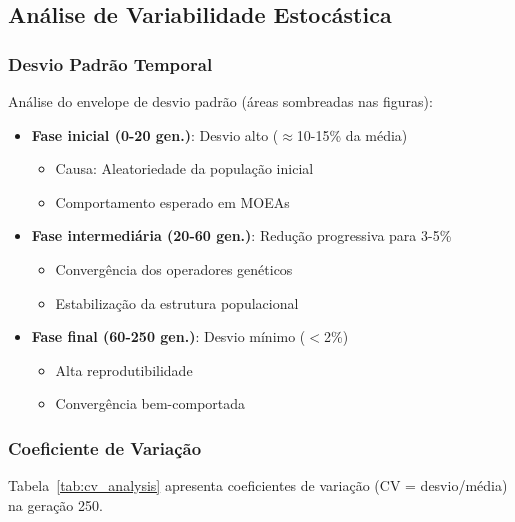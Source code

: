\subsection{Análise de Variabilidade Estocástica}

\subsubsection{Desvio Padrão Temporal}

Análise do envelope de desvio padrão (áreas sombreadas nas figuras):

\begin{itemize}
    \item \textbf{Fase inicial (0-20 gen.)}: Desvio alto ($\approx$10-15\% da média)
    \begin{itemize}
        \item Causa: Aleatoriedade da população inicial
        \item Comportamento esperado em MOEAs
    \end{itemize}
    
    \item \textbf{Fase intermediária (20-60 gen.)}: Redução progressiva para 3-5\%
    \begin{itemize}
        \item Convergência dos operadores genéticos
        \item Estabilização da estrutura populacional
    \end{itemize}
    
    \item \textbf{Fase final (60-250 gen.)}: Desvio mínimo ($<$2\%)
    \begin{itemize}
        \item Alta reprodutibilidade
        \item Convergência bem-comportada
    \end{itemize}
\end{itemize}

\subsubsection{Coeficiente de Variação}

Tabela~\ref{tab:cv_analysis} apresenta coeficientes de variação (CV = desvio/média) na geração 250.

